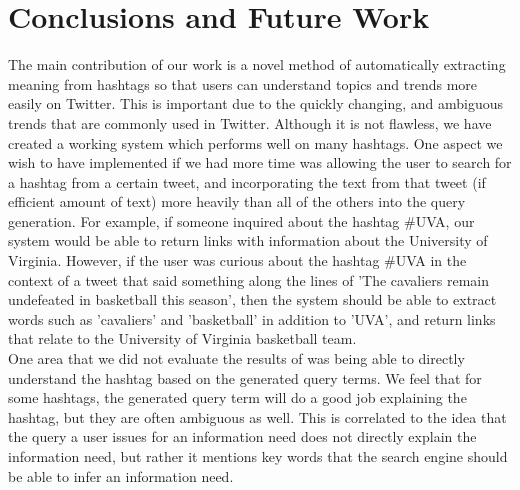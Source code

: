 \documentclass{sig-alternate}
\begin{document}
\section{Conclusions and Future Work}
\label{sec:conclusions}
The main contribution of our work is a novel method of automatically extracting meaning from hashtags so that users can understand topics and trends more easily on Twitter. This is important due to the quickly changing, and ambiguous trends that are commonly used in Twitter. Although it is not flawless, we have created a working system which performs well on many hashtags.
One aspect we wish to have implemented if we had more time was allowing the user to search for a hashtag from a certain tweet, and incorporating the text from that tweet (if efficient amount of text) more heavily than all of the others into the query generation. For example, if someone inquired about the hashtag \#UVA, our system would be able to return links with information about the University of Virginia. However, if the user was curious about the hashtag \#UVA in the context of a tweet that said something along the lines of 'The cavaliers remain undefeated in basketball this season', then the system should be able to extract words such as 'cavaliers' and 'basketball' in addition to 'UVA', and return links that relate to the University of Virginia basketball team.\\ 
One area that we did not evaluate the results of was being able to directly understand the hashtag based on the generated query terms. We feel that for some hashtags, the generated query term will do a good job explaining the hashtag, but they are often ambiguous as well. This is correlated to the idea that the query a user issues for an information need does not directly explain the information need, but rather it mentions key words that the search engine should be able to infer an information need.




\end{document}
